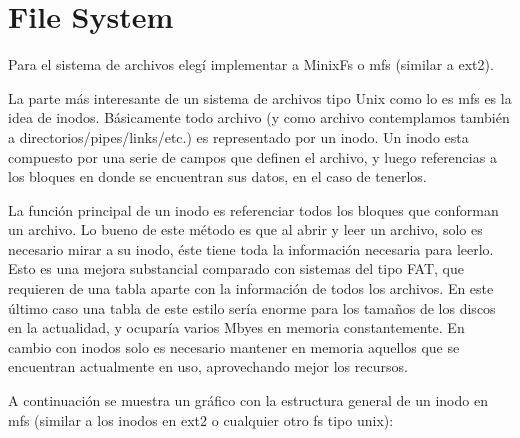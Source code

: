 \section{File System}

Para el sistema de archivos elegí implementar a MinixFs o mfs (similar a ext2).

La parte más interesante de un sistema de archivos tipo Unix como lo es mfs es
la idea de inodos. Básicamente todo archivo (y como archivo contemplamos también
a directorios/pipes/links/etc.) es representado por un inodo. Un inodo esta
compuesto por una serie de campos que definen el archivo, y luego referencias a
los bloques en donde se encuentran sus datos, en el caso de tenerlos.

La función principal de un inodo es referenciar todos los bloques que conforman
un archivo. Lo bueno de este método es que al abrir y leer un archivo, solo es
necesario mirar a su inodo, éste tiene toda la información necesaria para
leerlo. Esto es una mejora substancial comparado con sistemas del tipo FAT, que
requieren de una tabla aparte con la información de todos los archivos. En este
último caso una tabla de este estilo sería enorme para los tamaños de los discos
en la actualidad, y ocuparía varios Mbyes en memoria constantemente. En cambio
con inodos solo es necesario mantener en memoria aquellos que se encuentran
actualmente en uso, aprovechando mejor los recursos.

A continuación se muestra un gráfico con la estructura general de un inodo en
mfs (similar a los inodos en ext2 o cualquier otro fs tipo unix):

